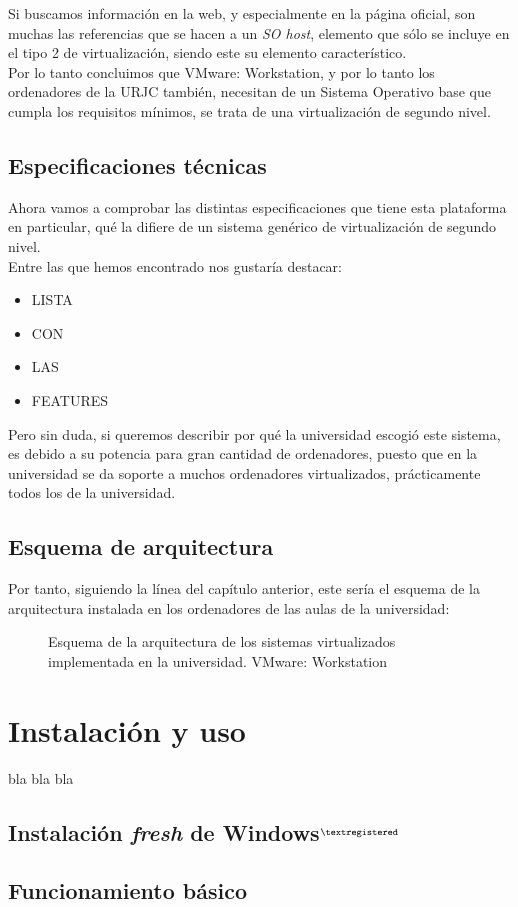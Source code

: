 Si buscamos información en la web\cite{refvmware1}, y especialmente en la página oficial\cite{vmwareworkguiaso}\cite{refvmware2}, son muchas las referencias que se hacen a un \emph{SO host}, elemento que sólo se incluye en el tipo 2 de virtualización, siendo este su elemento característico.\\

Por lo tanto concluimos que VMware: Workstation, y por lo tanto los ordenadores de la URJC también, necesitan de un Sistema Operativo base que cumpla los requisitos mínimos, se trata de una virtualización de segundo nivel.

\subsection{Especificaciones técnicas}
Ahora vamos a comprobar las distintas especificaciones que tiene esta plataforma en particular, qué la difiere de un sistema genérico de virtualización de segundo nivel.\\

Entre las que hemos encontrado nos gustaría destacar:

\begin{itemize}
\item LISTA
\item CON
\item LAS
\item FEATURES
\end{itemize}

Pero sin duda, si queremos describir por qué la universidad escogió este sistema, es debido a su potencia para gran cantidad de ordenadores, puesto que en la universidad se da soporte a muchos ordenadores virtualizados, prácticamente todos los de la universidad.

\subsection{Esquema de arquitectura}
Por tanto, siguiendo la línea del capítulo anterior, este sería el esquema de la arquitectura instalada en los ordenadores de las aulas de la universidad:

\begin{figure}[H]
\begin{center}
\end{center}
\caption[Arquitectura VMware: Workstation]{Esquema de la arquitectura de los sistemas virtualizados implementada en la universidad. VMware: Workstation}
\end{figure}

\section{Instalación y uso}
bla bla bla

\subsection{Instalación \emph{fresh} de Windows$^{\textregistered}$}

\subsection{Funcionamiento básico}